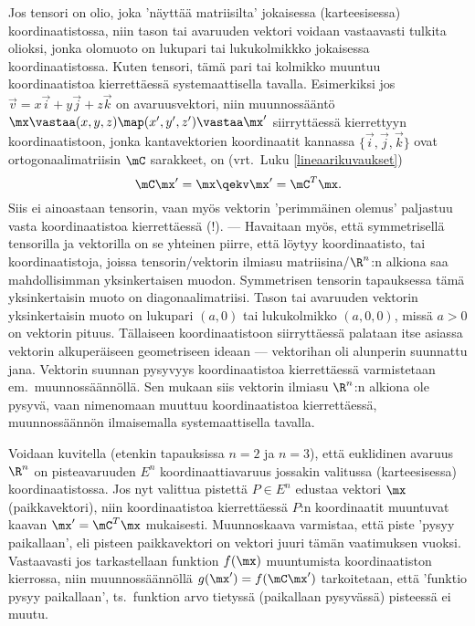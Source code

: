 Jos tensori on olio, joka 'näyttää matriisilta' jokaisessa (karteesisessa) koordinaatistossa,
niin tason tai avaruuden vektori voidaan vastaavasti tulkita olioksi, jonka olomuoto on lukupari
tai lukukolmikkko jokaisessa koordinaatistossa. Kuten tensori, tämä pari tai kolmikko muuntuu
koordinaatistoa kierrettäessä systemaattisella tavalla. Esimerkiksi jos 
$\vec v=x\vec i + y\vec j + z\vec k$ on avaruusvektori, niin muunnossääntö 
$\mx \vastaa (x,y,z) \map (x',y',z') \vastaa \mx'$ siirryttäessä kierrettyyn koordinaatistoon,
jonka kantavektorien koordinaatit kannassa $\{\vec i,\vec j,\vec k\}$ ovat 
ortogonaalimatriisin $\mC$ sarakkeet, on (vrt.\ Luku \ref{lineaarikuvaukset})
\[
\mC\mx'=\mx \qekv \mx'=\mC^T\mx.
\]
Siis ei ainoastaan tensorin, vaan myös vektorin 'perimmäinen olemus' paljastuu vasta 
koordinaatistoa kierrettäessä (!). --- Havaitaan myös, että symmetrisellä tensorilla ja 
vektorilla on se yhteinen piirre, että löytyy koordinaatisto, tai koordinaatistoja, joissa 
tensorin/vektorin ilmiasu matriisina/$\R^n$:n alkiona saa mahdollisimman yksinkertaisen muodon.
Symmetrisen tensorin tapauksessa tämä yksinkertaisin muoto on diagonaalimatriisi. Tason tai 
avaruuden vektorin yksinkertaisin muoto on lukupari $(a,0)$ tai lukukolmikko $(a,0,0)$, missä 
$a>0$ on vektorin pituus. Tällaiseen koordinaatistoon siirryttäessä  palataan itse asiassa 
vektorin alkuperäiseen geometriseen ideaan --- vektorihan oli alunperin suunnattu jana. Vektorin
suunnan pysyvyys koordinaatistoa kierrettäessä varmistetaan em.\ muunnossäännöllä. Sen mukaan
siis vektorin ilmiasu $\R^n$:n alkiona  ole pysyvä, vaan nimenomaan muuttuu 
koordinaatistoa kierrettäessä, muunnossäännön ilmaisemalla systemaattisella tavalla.
\begin{Exa} Voidaan kuvitella (etenkin tapauksissa $n=2$ ja $n=3$), että euklidinen avaruus 
$\R^n$ on pisteavaruuden $E^n$ koordinaattiavaruus jossakin valitussa (karteesisessa) 
koordinaatistossa. Jos nyt valittua pistettä $P \in E^n$ edustaa vektori $\mx$ (paikkavektori),
niin koordinaatistoa kierrettäessä $P$:n koordinaatit muuntuvat kaavan $\mx'=\mC^T\mx$
mukaisesti. Muunnoskaava varmistaa, että piste 'pysyy paikallaan', eli pisteen paikkavektori on
vektori juuri tämän vaatimuksen vuoksi. Vastaavasti jos tarkastellaan funktion $f(\mx)$
muuntumista koordinaatiston kierrossa, niin muunnossäännöllä $g(\mx')=f(\mC\mx')$ tarkoitetaan,
että 'funktio pysyy paikallaan', ts.\ funktion arvo tietyssä (paikallaan pysyvässä) pisteessä
ei muutu. \loppu \end{Exa}
